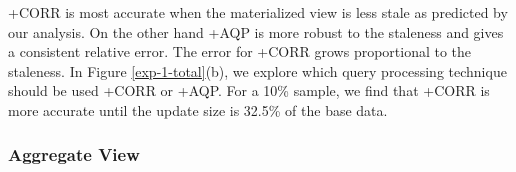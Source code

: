 \svcnospace+CORR is most accurate when the materialized view is less stale as predicted by our analysis.
On the other hand \svcnospace+AQP is more robust to the staleness and gives a consistent relative error.
The error for \svcnospace+CORR grows proportional to the staleness.
In Figure \ref{exp-1-total}(b), we explore which query processing technique should be used \svcnospace+CORR or \svcnospace+AQP.
For a 10\% sample, we find that \svcnospace+CORR is more accurate until the update size is 32.5\% of the base data.



\iffalse
\subsubsection{Aggregate View}
\label{exp-datacube}

